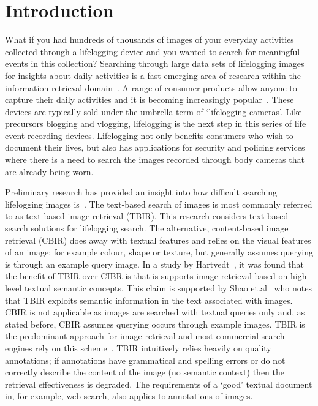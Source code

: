 \chapter{Introduction}

What if you had hundreds of thousands of images of your everyday activities collected through a lifelogging device and you wanted to search for meaningful events in this collection? Searching through large data sets of lifelogging images for insights about daily activities is a fast emerging area of research within the information retrieval domain~\cite{gurrin2014lifelogging}. A range of consumer products allow anyone to capture their daily activities and it is becoming increasingly popular~\cite{gurrin2014lifelogging}\cite{van2014future}\cite{askoxylakis2011log}. These devices are typically sold under the umbrella term of `lifelogging cameras'. Like precursors blogging and vlogging, lifelogging is the next step in this series of life event recording devices. Lifelogging not only benefits consumers who wish to document their lives, but also has applications for security and policing services where there is a need to search the images recorded through body cameras that are already being worn.

Preliminary research has provided an insight into how difficult searching lifelogging images is~\cite{scells2016qut}. The text-based search of images is most commonly referred to as text-based image retrieval (TBIR). This research considers text based search solutions for lifelogging search. The alternative, content-based image retrieval (CBIR) does away with textual features and relies on the visual features of an image; for example colour, shape or texture, but generally assumes querying is through an example query image. In a study by Hartvedt~\cite{hartvedt2010using}, it was found that the benefit of TBIR over CIBR is that is supports image retrieval based on high-level textual semantic concepts. This claim is supported by Shao et.al~\cite{medical2004shao} who notes that TBIR exploits semantic information in the text associated with images. CBIR is not applicable as images are searched with textual queries only and, as stated before, CBIR assumes querying occurs through example images. TBIR is the predominant approach for image retrieval and most commercial search engines rely on this scheme~\cite{escalante2007towards}. TBIR intuitively relies heavily on quality annotations; if annotations have grammatical and spelling errors or do not correctly describe the content of the image (no semantic context) then the retrieval effectiveness is degraded. The requirements of a `good' textual document in, for example, web search, also applies to annotations of images.

